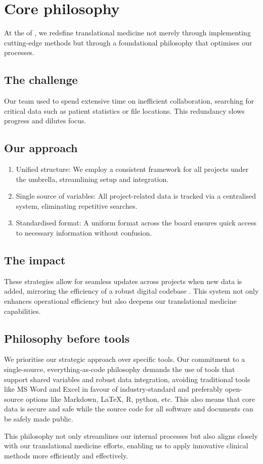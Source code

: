 \section{Core philosophy}
At the \pmu of \kispi, we redefine translational medicine not merely through implementing cutting-edge methods but through a foundational philosophy that optimises our processes.


\subsection*{The challenge}
Our team used to spend extensive time on inefficient collaboration, searching for critical data such as patient statistics or file locations.
This redundancy slows progress and dilutes focus.

\subsection*{Our approach}
\begin{enumerate}
\item  Unified structure: We employ a consistent framework for all projects under the \pmu umbrella, streamlining setup and integration.
\item Single source of variables: All project-related data is tracked via a centralised system, eliminating repetitive searches.
\item Standardised format: A uniform format across the board ensures quick access to necessary information without confusion.
\end{enumerate}

\subsection*{The impact}
These strategies allow for seamless updates across projects when new data is added, mirroring the efficiency of a robust digital codebase 
\citep{potvin_levenberg_google_ACM}. 
This system not only enhances operational efficiency but also deepens our translational medicine capabilities.

\subsection*{Philosophy before tools}
We prioritise our strategic approach over specific tools. 
Our commitment to a single-source, everything-as-code philosophy demands the use of tools that support shared variables and robust data integration, avoiding traditional tools like MS Word and Excel in favour of industry-standard and preferably open-source options like Markdown, LaTeX, R, python, etc.
This also means that core data is secure and safe while the source code for all software and documents can be safely made public.

This philosophy not only streamlines our internal processes but also aligns closely with our translational medicine efforts, enabling us to apply innovative clinical methods more efficiently and effectively.
